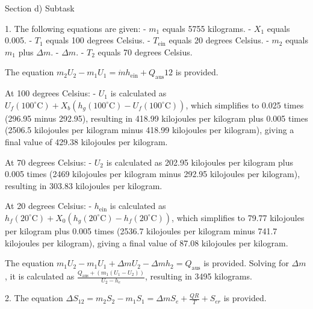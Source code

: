 Section d) Subtask

1. The following equations are given:
   - \( m_1 \) equals 5755 kilograms.
   - \( X_1 \) equals 0.005.
   - \( T_1 \) equals 100 degrees Celsius.
   - \( T_{\text{ein}} \) equals 20 degrees Celsius.
   - \( m_2 \) equals \( m_1 \) plus \( \Delta m \).
   - \( \Delta m \).
   - \( T_2 \) equals 70 degrees Celsius.

   The equation \( m_2 U_2 - m_1 U_1 = \dot{m} h_{\text{ein}} + Q_{\text{aus}} 12 \) is provided.

   At 100 degrees Celsius:
   - \( U_1 \) is calculated as \( U_f (100^\circ \text{C}) + X_b \left( h_g (100^\circ \text{C}) - U_f (100^\circ \text{C}) \right) \), which simplifies to 0.025 times (296.95 minus 292.95), resulting in 418.99 kilojoules per kilogram plus 0.005 times (2506.5 kilojoules per kilogram minus 418.99 kilojoules per kilogram), giving a final value of 429.38 kilojoules per kilogram.

   At 70 degrees Celsius:
   - \( U_2 \) is calculated as 202.95 kilojoules per kilogram plus 0.005 times (2469 kilojoules per kilogram minus 292.95 kilojoules per kilogram), resulting in 303.83 kilojoules per kilogram.

   At 20 degrees Celsius:
   - \( h_{\text{ein}} \) is calculated as \( h_f (20^\circ \text{C}) + X_0 (h_g (20^\circ \text{C}) - h_f (20^\circ \text{C})) \), which simplifies to 79.77 kilojoules per kilogram plus 0.005 times (2536.7 kilojoules per kilogram minus 741.7 kilojoules per kilogram), giving a final value of 87.08 kilojoules per kilogram.

   The equation \( m_1 U_2 - m_1 U_1 + \Delta m U_2 - \Delta m h_2 = Q_{\text{aus}} \) is provided. Solving for \( \Delta m \), it is calculated as \( \frac{Q_{\text{aus}} + (m_1 (U_1 - U_2))}{U_2 - h_e} \), resulting in 3495 kilograms.

2. The equation \( \Delta S_{12} = m_2 S_2 - m_1 S_1 = \Delta m S_e + \frac{QR}{T} + S_{er} \) is provided.